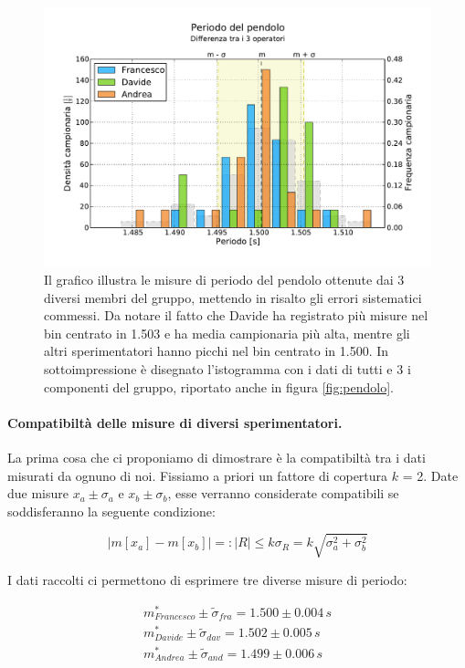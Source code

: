 \begin{figure}[bt]
	\centering
	\includegraphics[width=150mm]{grafici/pendolo3.pdf}
	\caption{Il grafico illustra le misure di periodo del pendolo ottenute
        dai 3 diversi membri del gruppo, mettendo in risalto gli errori
        sistematici commessi. Da notare il fatto che Davide ha registrato più
        misure nel bin centrato in 1.503 e ha media campionaria più alta, mentre gli
        altri sperimentatori hanno picchi nel bin centrato in 1.500. In sottoimpressione
        è disegnato l'istogramma con i dati di tutti e 3 i componenti del gruppo, riportato
        anche in figura \ref{fig:pendolo}.}
    \label{fig:pendolo3}
\end{figure}

\paragraph{Compatibiltà delle misure di diversi sperimentatori.}

La prima cosa che ci proponiamo di dimostrare è la compatibiltà
tra i dati misurati da ognuno di noi. Fissiamo a priori un fattore
di copertura $k$ = 2. Date due misure $x_a \pm \sigma_a$ e $x_b \pm \sigma_b$,
esse verranno considerate compatibili se soddisferanno la seguente condizione:

\begin{equation}
    |m[x_a] - m[x_b]| =: |R| \leq k\sigma_R = k\sqrt{\sigma_a^2 + \sigma_b^2}
\end{equation}

I dati raccolti ci permettono di esprimere tre diverse misure di periodo:

\begin{equation*}
	\begin{split}
		m_{Francesco}^* \pm \tilde{\sigma}_{fra}  = 1.500 \pm 0.004\,s \\
		m_{Davide}^* \pm \tilde{\sigma}_{dav} = 1.502 \pm 0.005\,s \\
		m_{Andrea}^* \pm \tilde{\sigma}_{and} = 1.499 \pm 0.006\,s
	\end{split}
\end{equation*}

